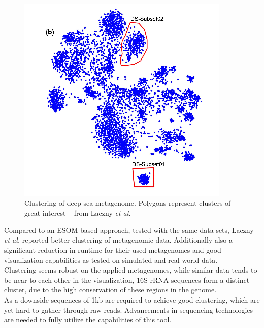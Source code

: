 \documentclass[twocolumn]{bmcart}%
\begin{document}
\begin{figure}[h]
		\centering
	\includegraphics[width=.9\linewidth]{bilder/marineCluster.png}
	\caption{Clustering of deep sea metagenome. Polygons represent clusters of great interest -- from Laczny \textit{et al.}\cite{Laczny2014}}
	\label{img:deepsea}
\end{figure}%

Compared to an ESOM-based approach, tested with the same data sets, Laczny \textit{et al.} reported better clustering of metagenomic-data. Additionally also a significant reduction in runtime \cite{Laczny2014} for their used metagenomes and good visualization capabilities as tested on simulated and real-world data.\\
Clustering seems robust on the applied metagenomes, while similar data tends to be near to each other in the visualization, 16S rRNA sequences form a distinct cluster, due to the high conservation of these regions in the genome.\\
As a downside sequences of 1kb are required to achieve good clustering, which are yet hard to gather through raw reads. Advancements in sequencing technologies are needed to fully utilize the capabilities of this tool.
\end{document}

